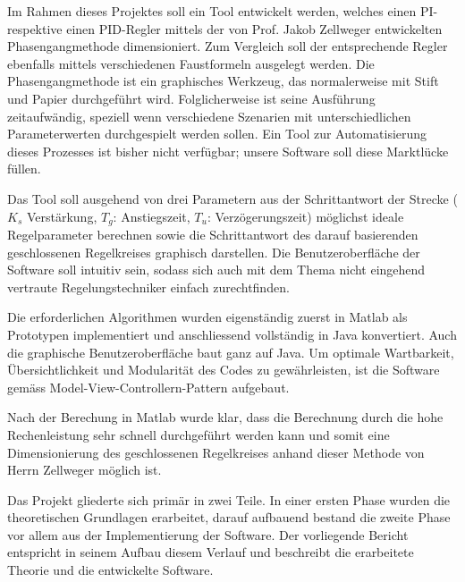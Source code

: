 Im Rahmen dieses Projektes soll ein  Tool entwickelt werden, welches einen PI-  %
respektive einen PID-Regler mittels der von Prof. Jakob Zellweger entwickelten
Phasengangmethode                                                               %
dimensioniert. Zum Vergleich  soll der entsprechende Regler  ebenfalls mittels
verschiedenen  Faustformeln ausgelegt  werden. Die  Phasengangmethode ist  ein
graphisches Werkzeug,  das normalerweise  mit Stift und  Papier durchgef\"uhrt
wird. Folglicherweise  ist seine  Ausf\"uhrung zeitaufw\"andig,  speziell wenn
verschiedene  Szenarien  mit unterschiedlichen  Parameterwerten  durchgespielt
werden sollen. Ein Tool zur Automatisierung  dieses Prozesses ist bisher nicht
verf\"ugbar; unsere Software soll diese Marktl\"ucke f\"ullen.

Das Tool soll ausgehend von drei Parametern aus der Schrittantwort der Strecke  %
($K_s$ Verst\"arkung, $T_g$: Anstiegszeit, $T_u$: Verz\"ogerungszeit)           %
 m\"oglichst ideale  Regelparameter  berechnen
sowie  die Schrittantwort  des darauf  basierenden geschlossenen  Regelkreises
graphisch  darstellen. Die  Benutzeroberfl\"ache  der Software  soll  intuitiv
sein,   sodass   sich  auch   mit   dem   Thema  nicht   eingehend   vertraute
Regelungstechniker einfach zurechtfinden.

Die  erforderlichen   Algorithmen  wurden  eigenst\"andig  zuerst   in  Matlab %
als  Prototypen   implementiert  und   anschliessend  vollst\"andig   in  Java
konvertiert. Auch die  graphische Benutzeroberfl\"ache baut ganz  auf Java. Um
optimale  Wartbarkeit,  \"Ubersichtlichkeit  und Modularit\"at  des  Codes  zu
gew\"ahrleisten,  ist  die  Software  gem\"ass  Model-View-Controllern-Pattern
aufgebaut.

Nach  der Berechung  in  Matlab  wurde klar,  dass  die  Berechnung durch  die %
hohe Rechenleistung  sehr schnell  durchgef\"uhrt werden  kann und  somit eine
Dimensionierung des geschlossenen Regelkreises anhand dieser Methode von Herrn
Zellweger m\"oglich ist.

Das  Projekt gliederte  sich prim\"ar  in  zwei Teile. In  einer ersten  Phase %
wurden  die  theoretischen  Grundlagen erarbeitet,  darauf  aufbauend  bestand
die  zweite  Phase  vor  allem   aus  der  Implementierung  der  Software. Der
vorliegende Bericht entspricht in seinem  Aufbau diesem Verlauf und beschreibt die erarbeitete Theorie und die entwickelte Software.
